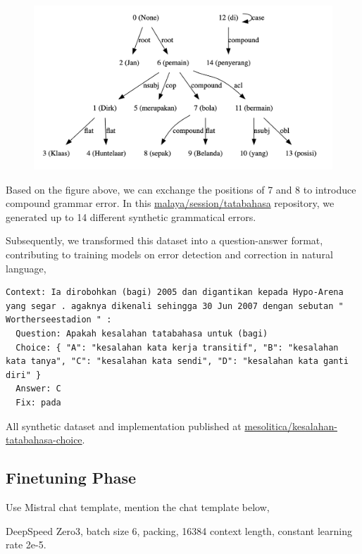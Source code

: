\documentclass{article}
\begin{document}
\pagebreak

\begin{figure}[h]
  \centering
  \includegraphics[width=0.6\linewidth]{pic/dependency.png} %
\end{figure}

Based on the figure above, we can exchange the positions of 7 and 8 to introduce compound grammar error. In this \href{https://github.com/mesolitica/malaya/tree/master/session/tatabahasa/prepare-dataset}{malaya/session/tatabahasa} repository, we generated up to 14 different synthetic grammatical errors.

Subsequently, we transformed this dataset into a question-answer format, contributing to training models on error detection and correction in natural language,

\begin{lstlisting}[breaklines=true]
  Context: Ia dirobohkan (bagi) 2005 dan digantikan kepada Hypo-Arena yang segar . agaknya dikenali sehingga 30 Jun 2007 dengan sebutan " Wortherseestadion " :
  Question: Apakah kesalahan tatabahasa untuk (bagi)
  Choice: { "A": "kesalahan kata kerja transitif", "B": "kesalahan kata tanya", "C": "kesalahan kata sendi", "D": "kesalahan kata ganti diri" }
  Answer: C
  Fix: pada
\end{lstlisting}

All synthetic dataset and implementation published at \href{https://huggingface.co/datasets/mesolitica/kesalahan-tatabahasa-choice}{mesolitica/kesalahan-tatabahasa-choice}.

\subsection{Finetuning Phase}

Use Mistral chat template, mention the chat template below,

DeepSpeed Zero3, batch size 6, packing, 16384 context length, constant learning rate 2e-5.

\end{document}
